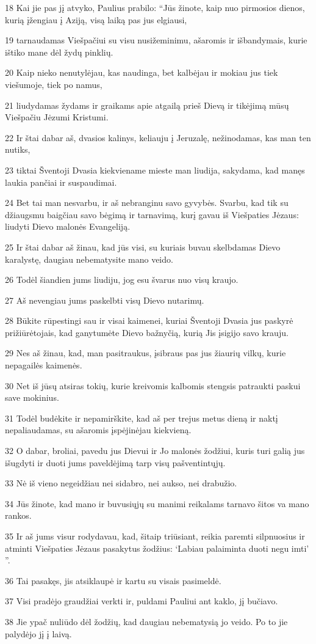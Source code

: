 \par 18 Kai jie pas jį atvyko, Paulius prabilo: “Jūs žinote, kaip nuo pirmosios dienos, kurią įžengiau į Aziją, visą laiką pas jus elgiausi, 
\par 19 tarnaudamas Viešpačiui su visu nusižeminimu, ašaromis ir išbandymais, kurie ištiko mane dėl žydų pinklių. 
\par 20 Kaip nieko nenutylėjau, kas naudinga, bet kalbėjau ir mokiau jus tiek viešumoje, tiek po namus, 
\par 21 liudydamas žydams ir graikams apie atgailą prieš Dievą ir tikėjimą mūsų Viešpačiu Jėzumi Kristumi. 
\par 22 Ir štai dabar aš, dvasios kalinys, keliauju į Jeruzalę, nežinodamas, kas man ten nutiks, 
\par 23 tiktai Šventoji Dvasia kiekviename mieste man liudija, sakydama, kad manęs laukia pančiai ir suspaudimai. 
\par 24 Bet tai man nesvarbu, ir aš nebranginu savo gyvybės. Svarbu, kad tik su džiaugsmu baigčiau savo bėgimą ir tarnavimą, kurį gavau iš Viešpaties Jėzaus: liudyti Dievo malonės Evangeliją. 
\par 25 Ir štai dabar aš žinau, kad jūs visi, su kuriais buvau skelbdamas Dievo karalystę, daugiau nebematysite mano veido. 
\par 26 Todėl šiandien jums liudiju, jog esu švarus nuo visų kraujo. 
\par 27 Aš nevengiau jums paskelbti visų Dievo nutarimų. 
\par 28 Būkite rūpestingi sau ir visai kaimenei, kuriai Šventoji Dvasia jus paskyrė prižiūrėtojais, kad ganytumėte Dievo bažnyčią, kurią Jis įsigijo savo krauju. 
\par 29 Nes aš žinau, kad, man pasitraukus, įsibraus pas jus žiaurių vilkų, kurie nepagailės kaimenės. 
\par 30 Net iš jūsų atsiras tokių, kurie kreivomis kalbomis stengsis patraukti paskui save mokinius. 
\par 31 Todėl budėkite ir nepamirškite, kad aš per trejus metus dieną ir naktį nepaliaudamas, su ašaromis įspėjinėjau kiekvieną. 
\par 32 O dabar, broliai, pavedu jus Dievui ir Jo malonės žodžiui, kuris turi galią jus išugdyti ir duoti jums paveldėjimą tarp visų pašventintųjų. 
\par 33 Nė iš vieno negeidžiau nei sidabro, nei aukso, nei drabužio. 
\par 34 Jūs žinote, kad mano ir buvusiųjų su manimi reikalams tarnavo šitos va mano rankos. 
\par 35 Ir aš jums visur rodydavau, kad, šitaip triūsiant, reikia paremti silpnuosius ir atminti Viešpaties Jėzaus pasakytus žodžius: ‘Labiau palaiminta duoti negu imti’ ”. 
\par 36 Tai pasakęs, jis atsiklaupė ir kartu su visais pasimeldė. 
\par 37 Visi pradėjo graudžiai verkti ir, puldami Pauliui ant kaklo, jį bučiavo. 
\par 38 Jie ypač nuliūdo dėl žodžių, kad daugiau nebematysią jo veido. Po to jie palydėjo jį į laivą.


